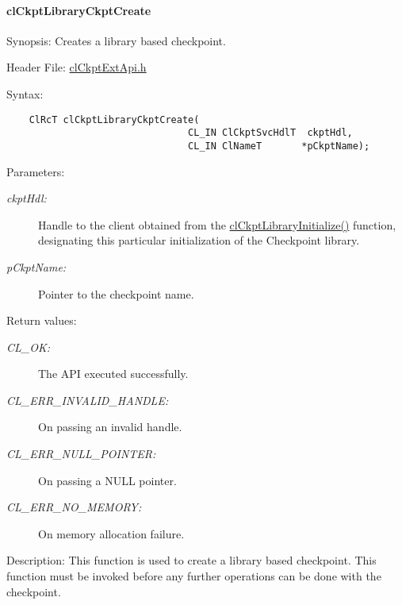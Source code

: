 \hypertarget{pageckpt203}{}\paragraph{cl\-Ckpt\-Library\-Ckpt\-Create}\label{pageckpt203}
\begin{Desc}
\item[Synopsis:]Creates a library based checkpoint.\end{Desc}
\begin{Desc}
\item[Header File:]\hyperlink{cl_ckpt_ext_api_8h}{cl\-Ckpt\-Ext\-Api.h}\end{Desc}
\begin{Desc}
\item[Syntax:]

\footnotesize\begin{verbatim}    ClRcT clCkptLibraryCkptCreate(
                                CL_IN ClCkptSvcHdlT  ckptHdl,
                                CL_IN ClNameT       *pCkptName);
\end{verbatim}
\normalsize
\end{Desc}
\begin{Desc}
\item[Parameters:]
\begin{description}
\item[{\em ckpt\-Hdl:}]Handle to the client obtained from the \hyperlink{group__group10_ga2}{cl\-Ckpt\-Library\-Initialize()} function, designating this particular initialization of the Checkpoint library. \item[{\em p\-Ckpt\-Name:}]Pointer to the checkpoint name.\end{description}
\end{Desc}
\begin{Desc}
\item[Return values:]
\begin{description}
\item[{\em CL\_\-OK:}]The API executed successfully. \item[{\em CL\_\-ERR\_\-INVALID\_\-HANDLE:}]On passing an invalid handle. \item[{\em CL\_\-ERR\_\-NULL\_\-POINTER:}]On passing a NULL pointer. \item[{\em CL\_\-ERR\_\-NO\_\-MEMORY:}]On memory allocation failure.\end{description}
\end{Desc}
\begin{Desc}
\item[Description:]This function is used to create a library based checkpoint. This function must be invoked before any further operations can be done with the checkpoint.\end{Desc}
